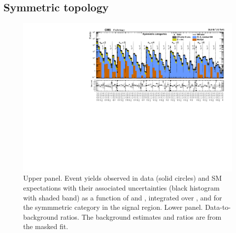 \clearpage
\subsection{Symmetric topology}

\begin{figure}[h!]
  \centering
  \caption{Upper panel. Event yields observed in data (solid circles)
    and SM expectations with their associated uncertainties (black
    histogram with shaded band) as a function of \nb and \scalht,
    integrated over \mht, and for the symmmetric \njet category
    in the signal region. Lower panel. Data-to-background ratios. The
    background estimates and ratios are from the masked fit. }
  \label{fig:mr_symm_pre}
  \includegraphics[width=1.\linewidth]{figures/results/36invfb/symm/summaryPlot_Symmetric_prefit}
\end{figure}


